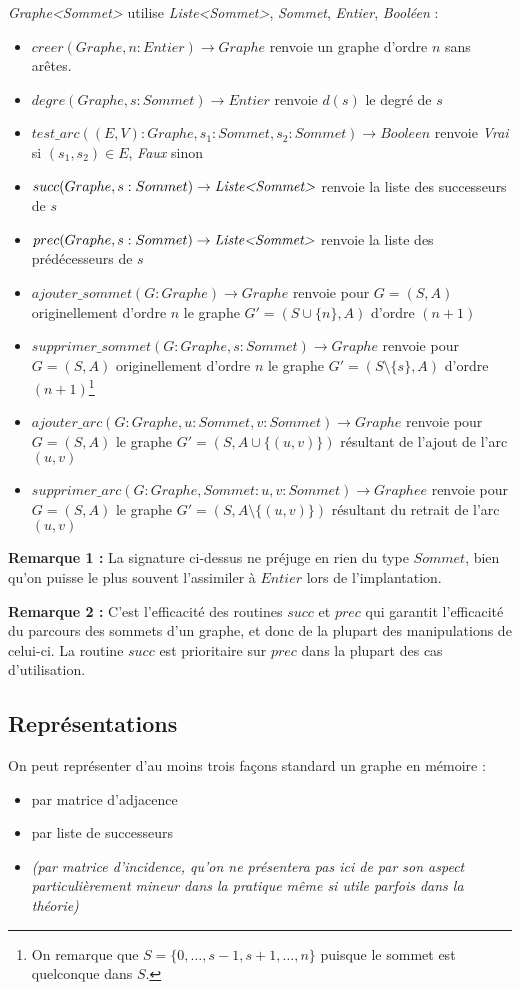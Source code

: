 \documentclass[../../../main.tex]{subfiles}
\begin{document}
\textit{Graphe\textless Sommet\textgreater} utilise \textit{Liste\textless Sommet\textgreater}, \textit{Sommet}, \textit{Entier}, \textit{Booléen} :
\begin{itemize}
	\item $creer(Graphe, n:Entier)\rightarrow Graphe$ renvoie un graphe d'ordre $n$ sans arêtes.
	\item $degre(Graphe, s:Sommet)\rightarrow Entier$ renvoie $d(s)$ le degré de $s$
	\item $test\_arc((E, V):Graphe, s_1:Sommet, s_2:Sommet)\rightarrow Booleen$ renvoie \textit{Vrai} si $(s_1, s_2)\in E$, \textit{Faux} sinon
	\item $succ(Graphe, s:Sommet)\rightarrow \textit{Liste\textless Sommet\textgreater}$ renvoie la liste des successeurs de $s$
	\item $prec(Graphe, s:Sommet)\rightarrow \textit{Liste\textless Sommet\textgreater}$ renvoie la liste des prédécesseurs de $s$
	\item $ajouter\_sommet(G:Graphe)\rightarrow Graphe$ renvoie pour $G = (S, A)$ originellement d'ordre $n$ le graphe $G'=(S\cup\{n\}, A)$ d'ordre $(n+1)$
	\item $supprimer\_sommet(G:Graphe, s:Sommet)\rightarrow Graphe$ renvoie pour $G = (S, A)$ originellement d'ordre $n$ le graphe $G'=(S\setminus\{s\}, A)$ d'ordre $(n+1)$\footnote{On remarque que $S = \{0, \dots, s-1, s+1, \dots, n\}$ puisque le sommet est quelconque dans $S$.}
	\item $ajouter\_arc(G:Graphe, u:Sommet, v:Sommet)\rightarrow Graphe$ renvoie pour $G = (S, A)$ le graphe $G' = (S, A\cup\{(u, v)\})$ résultant de l'ajout de l'arc $(u, v)$
	\item $supprimer\_arc(G:Graphe, Sommet:u, v:Sommet)\rightarrow Graphee$ renvoie pour $G = (S, A)$ le graphe $G' = (S, A\setminus\{(u, v)\})$ résultant du retrait de l'arc $(u, v)$
\end{itemize}
\textbf{Remarque 1 :} La signature ci-dessus ne préjuge en rien du type $Sommet$, bien qu'on puisse le plus souvent l'assimiler à $Entier$ lors de l'implantation.

\textbf{Remarque 2 :} C'est l'efficacité des routines $succ$ et $prec$ qui garantit l'efficacité du parcours des sommets d'un graphe, et donc de la plupart des manipulations de celui-ci. La routine $succ$ est prioritaire sur $prec$ dans la plupart des cas d'utilisation.
\subsection{Représentations}
\label{sub:representations_graphe}
On peut représenter d'au moins trois façons standard un graphe en mémoire :
\begin{itemize}
	\item par matrice d'adjacence
	\item par liste de successeurs
	\item \textit{\tiny(par matrice d'incidence, qu'on ne présentera pas ici de par son aspect particulièrement mineur dans la pratique même si utile parfois dans la théorie)}
\end{itemize}
\end{document}
